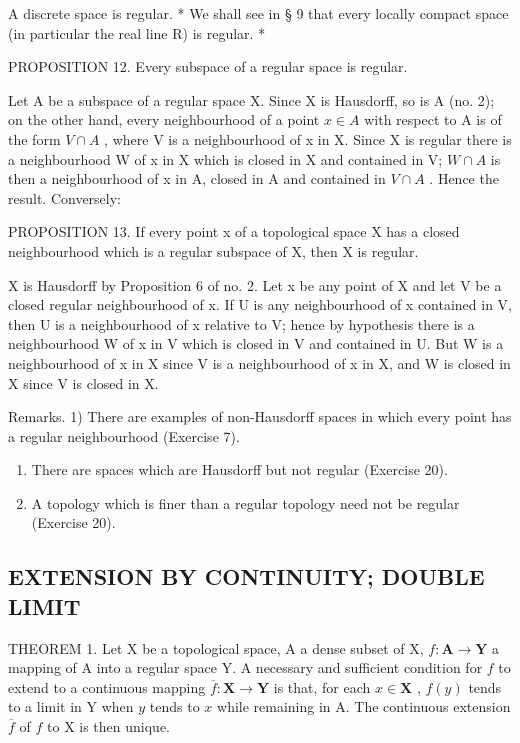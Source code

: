 A discrete space is regular. * We shall see in § 9 that every locally compact space (in particular the real line R) is regular. *

PROPOSITION 12. Every subspace of a regular space is regular.

Let A be a subspace of a regular space X. Since X is Hausdorff, so is A (no. 2); on the other hand, every neighbourhood of a point \(x \in A\) with respect to A is of the form \(V \cap A\) , where V is a neighbourhood of x in X. Since X is regular there is a neighbourhood W of x in X which is closed in X and contained in V; \(W \cap A\) is then a neighbourhood of x in A, closed in A and contained in \(V \cap A\) . Hence the result. Conversely:

PROPOSITION 13. If every point x of a topological space X has a closed neighbourhood which is a regular subspace of X, then X is regular.

X is Hausdorff by Proposition 6 of no. 2. Let x be any point of X and let V be a closed regular neighbourhood of x. If U is any neighbourhood of x contained in V, then U is a neighbourhood of x relative to V; hence by hypothesis there is a neighbourhood W of x in V which is closed in V and contained in U. But W is a neighbourhood of x in X since V is a neighbourhood of x in X, and W is closed in X since V is closed in X.

Remarks. 1) There are examples of non-Hausdorff spaces in which every point has a regular neighbourhood (Exercise 7).

\begin{enumerate}
\def\labelenumi{\arabic{enumi})}
\setcounter{enumi}{1}
\item
  There are spaces which are Hausdorff but not regular (Exercise 20).
\item
  A topology which is finer than a regular topology need not be regular (Exercise 20).
\end{enumerate}

\subsection{EXTENSION BY CONTINUITY; DOUBLE LIMIT}

THEOREM 1. Let X be a topological space, A a dense subset of X, \(f: \mathbf{A} \to \mathbf{Y}\) a mapping of A into a regular space Y. A necessary and sufficient condition for \(f\) to extend to a continuous mapping \(\overline{f}: \mathbf{X} \to \mathbf{Y}\) is that, for each \(x \in \mathbf{X}\) , \(f(y)\) tends to a limit in Y when \(y\) tends to \(x\) while remaining in A. The continuous extension \(\overline{f}\) of \(f\) to X is then unique.


